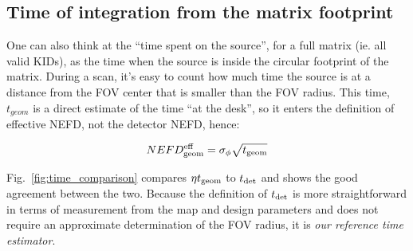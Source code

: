 \subsection{Time of integration from the matrix footprint}

One can also think at the ``time spent on the source'', for a full matrix
(ie. all valid KIDs), as the time when the source is inside the circular
footprint of the matrix. During a scan, it's easy to count how much time the
source is at a distance from the FOV center that is smaller than the FOV
radius. This time, $t_{geom}$ is a direct estimate of the time ``at the desk'',
so it enters the definition of effective NEFD, not the detector NEFD, hence:

\begin{equation}
NEFD^{\rm{eff}}_{\rm{geom}} = \sigma_\phi \sqrt{t_{\rm{geom}}}
\end{equation}

Fig.~\ref{fig:time_comparison} compares $\eta t_{\rm{geom}}$ to $t_{\rm{det}}$ and shows
the good agreement between the two. Because the definition of $t_{\rm{det}}$ is more
straightforward in terms of measurement from the map and design parameters and
does not require an approximate determination of the FOV radius, it is 
\emph{our reference time estimator}.



